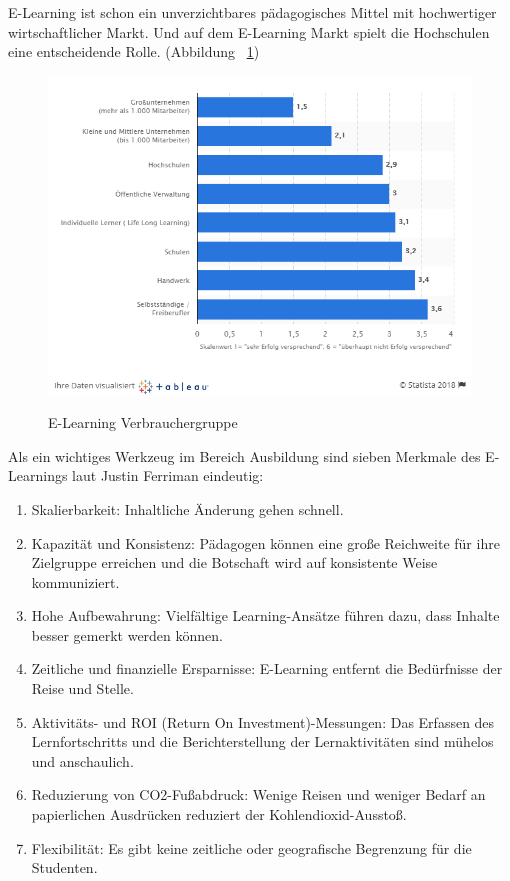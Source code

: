E-Learning ist schon ein unverzichtbares pädagogisches Mittel mit hochwertiger wirtschaftlicher Markt. Und auf dem E-Learning Markt spielt die Hochschulen eine entscheidende Rolle. (Abbildung ~\ref{fig:zielgruppe})

\begin{figure}[ht]
\vspace*{1em}
\centering
\caption[E-Learning Verbrauchergruppe]{E-Learning Verbrauchergruppe}
\includegraphics[width=\textwidth]{images/zielgruppe.png}
\label{fig:zielgruppe} 
\end{figure}

Als ein wichtiges Werkzeug im Bereich Ausbildung sind sieben Merkmale des E-Learnings laut Justin Ferriman \citep{6} eindeutig:

\begin{enumerate}
\item Skalierbarkeit: Inhaltliche Änderung gehen schnell. 
\item Kapazität und Konsistenz: Pädagogen können eine große Reichweite für ihre Zielgruppe erreichen und die Botschaft wird auf konsistente Weise kommuniziert.
\item Hohe Aufbewahrung: Vielfältige Learning-Ansätze führen dazu, dass Inhalte besser gemerkt werden können.
\item Zeitliche und finanzielle Ersparnisse: E-Learning entfernt die Bedürfnisse der Reise und Stelle.
\item Aktivitäts- und ROI (Return On Investment)-Messungen: Das Erfassen des Lernfortschritts und die Berichterstellung der Lernaktivitäten sind mühelos und anschaulich.
\item Reduzierung von CO2-Fußabdruck: Wenige Reisen und weniger Bedarf an papierlichen Ausdrücken reduziert der Kohlendioxid-Ausstoß.
\item Flexibilität: Es gibt keine zeitliche oder geografische Begrenzung für die Studenten.
\end{enumerate}\

